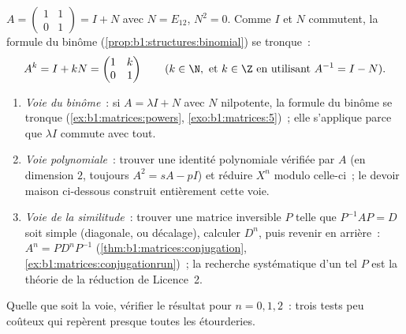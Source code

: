 \begin{example}\label{ex:b1:matrices:powers}
$A = \begin{pmatrix} 1 & 1 \\ 0 & 1\end{pmatrix} = I + N$ avec $N =
E_{12}$, $N^2 = 0$. Comme $I$ et $N$ commutent, la formule du binôme
(\cref{prop:b1:structures:binomial}) se tronque~:
\[
A^k = I + kN = \begin{pmatrix} 1 & k \\ 0 & 1 \end{pmatrix}
\qquad (k \in \N, \text{ et } k \in \Z \text{ en utilisant } A^{-1} = I -
N).
\]
\end{example}

\begin{method}
\label{met:b1:matrices:powers}
\begin{enumerate}
  \item \emph{Voie du binôme}~: si $A = \lambda I + N$ avec $N$
        nilpotente, la formule du binôme se tronque
        (\cref{ex:b1:matrices:powers}, \cref{exo:b1:matrices:5})~;
        elle s'applique parce que $\lambda I$ commute avec tout.
  \item \emph{Voie polynomiale}~: trouver une identité polynomiale
        vérifiée par $A$ (en dimension $2$, toujours $A^2 = sA -
        pI$) et réduire $X^n$ modulo celle-ci~; le devoir maison
        ci-dessous construit entièrement cette voie.
  \item \emph{Voie de la similitude}~: trouver une matrice inversible
        $P$ telle que $P^{-1}AP = D$ soit simple (diagonale, ou
        décalage), calculer $D^n$, puis revenir en arrière~: $A^n = P
        D^n P^{-1}$ (\cref{thm:b1:matrices:conjugation},
        \cref{ex:b1:matrices:conjugationrun})~; la recherche
        systématique d'un tel $P$ est la théorie de la réduction de
        Licence~2.
\end{enumerate}
Quelle que soit la voie, vérifier le résultat pour $n = 0, 1, 2$~:
trois tests peu coûteux qui repèrent presque toutes les étourderies.
\end{method}

